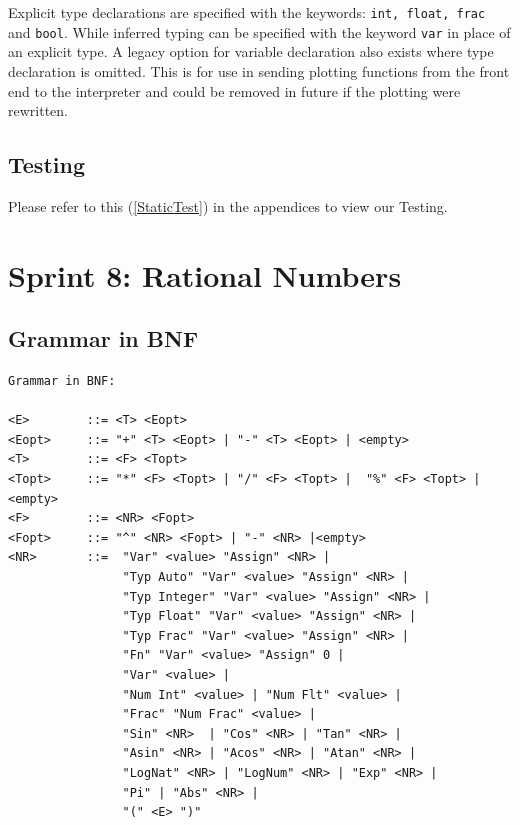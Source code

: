 \documentclass[a4paper, oneside, 11pt]{report}
\begin{document}
Explicit type declarations are specified with the keywords: \verb|int, float, frac| and \verb|bool|.
While inferred typing can be specified with the keyword \verb|var| in place of an explicit type.
A legacy option for variable declaration also exists where type declaration is omitted.
This is for use in sending plotting functions from the front end to the interpreter and could be removed in future if the plotting were rewritten.

\subsection{Testing}
Please refer to this (\ref{StaticTest}) in the appendices to view our Testing. \\


\clearpage
\section{Sprint 8: Rational Numbers}
\subsection{Grammar in BNF}
\begin{verbatim}
Grammar in BNF:

<E>        ::= <T> <Eopt>
<Eopt>     ::= "+" <T> <Eopt> | "-" <T> <Eopt> | <empty>
<T>        ::= <F> <Topt>
<Topt>     ::= "*" <F> <Topt> | "/" <F> <Topt> |  "%" <F> <Topt> |<empty>
<F>        ::= <NR> <Fopt>
<Fopt>     ::= "^" <NR> <Fopt> | "-" <NR> |<empty> 
<NR>       ::=  "Var" <value> "Assign" <NR> |
                "Typ Auto" "Var" <value> "Assign" <NR> |
                "Typ Integer" "Var" <value> "Assign" <NR> |
                "Typ Float" "Var" <value> "Assign" <NR> |
                "Typ Frac" "Var" <value> "Assign" <NR> |
                "Fn" "Var" <value> "Assign" 0 |
                "Var" <value> |
                "Num Int" <value> | "Num Flt" <value> |
                "Frac" "Num Frac" <value> |
                "Sin" <NR>  | "Cos" <NR> | "Tan" <NR> |
                "Asin" <NR> | "Acos" <NR> | "Atan" <NR> |
                "LogNat" <NR> | "LogNum" <NR> | "Exp" <NR> |
                "Pi" | "Abs" <NR> |
                "(" <E> ")"
\end{verbatim}
\end{document}
